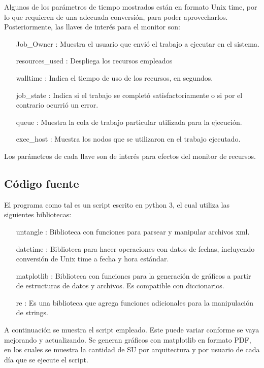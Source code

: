 Algunos de los parámetros de tiempo mostrados están en formato Unix time, por lo que requieren de una adecuada conversión, para poder aprovecharlos. Posteriormente, las llaves de interés para el monitor son:

\begin{itemize}
\item[Job\_Owner]: Muestra el usuario que envió el trabajo a ejecutar en el sistema.
\item[resources\_used]: Despliega los recursos empleados
\item[walltime]: Indica el tiempo de uso de los recursos, en segundos.
\item[job\_state]: Indica si el trabajo se completó satisfactoriamente o si por el contrario ocurrió un error.
\item[queue]: Muestra la cola de trabajo particular utilizada para la ejecución.
\item[exec\_host]: Muestra los nodos que se utilizaron en el trabajo ejecutado.
\end{itemize}

Los parámetros de cada llave son de interés para efectos del monitor de recursos.

\subsection{Código fuente}
El programa como tal es un script escrito en python 3, el cual utiliza las siguientes bibliotecas:

\begin{itemize}
\item[untangle]: Biblioteca con funciones para parsear y manipular archivos xml.
\item[datetime]: Biblioteca para hacer operaciones con datos de fechas, incluyendo conversión de Unix time a fecha y hora estándar.
\item[matplotlib]: Biblioteca con funciones para la generación de gráficos a partir de estructuras de datos y archivos. Es compatible con diccionarios.
\item[re]: Es una biblioteca que agrega funciones adicionales para la manipulación de strings.
\end{itemize}

A continuación se muestra el script empleado. Este puede variar conforme se vaya mejorando y actualizando. Se generan gráficos con matplotlib en formato PDF, en los cuales se muestra la cantidad de SU por arquitectura y por usuario de cada día que se ejecute el script.




\clearpage